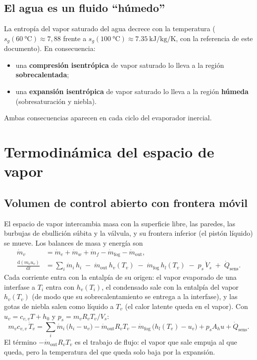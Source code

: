 \documentclass[11pt,a4paper]{article}
\newcommand{\dd}{\mathrm{d}}
\newcommand{\mdot}{\dot m}
\newcommand{\Qdot}{\dot Q}
\begin{document}
\subsection{El agua es un fluido ``húmedo''}

La entropía del vapor saturado del agua decrece con la temperatura ($s_g(\SI{60}{\celsius})\approx 7{,}88$ frente a $s_g(\SI{100}{\celsius})\approx\SI{7.35}{\kilo\joule\per\kilo\gram\per\kelvin}$, con la referencia de este documento). En consecuencia:
\begin{itemize}
\item una \textbf{compresión isentrópica} de vapor saturado lo lleva a la región \textbf{sobrecalentada};
\item una \textbf{expansión isentrópica} de vapor saturado lo lleva a la región \textbf{húmeda} (sobresaturación y niebla).
\end{itemize}
Ambas consecuencias aparecen en cada ciclo del evaporador inercial.

\section{Termodinámica del espacio de vapor}\label{sec:vapor}

\subsection{Volumen de control abierto con frontera móvil}

El espacio de vapor intercambia masa con la superficie libre, las paredes, las burbujas de ebullición súbita y la válvula, y su frontera inferior (el pistón líquido) se mueve. Los balances de masa y energía son
\begin{align}
\dot m_v &= \mdot_e + \mdot_w + \mdot_f - \mdot_{\mathrm{fog}} - \mdot_{\mathrm{out}},\\
\frac{\dd (m_v u_v)}{\dd t} &= \sum_i \mdot_i\,h_i \;-\; \mdot_{\mathrm{out}}\,h_v(T_v) \;-\; \mdot_{\mathrm{fog}}\,h_l(T_v) \;-\; p_s\,\dot V_s \;+\; \Qdot_{\mathrm{sens}} .
\end{align}
Cada corriente entra con la entalpía de su origen: el vapor evaporado de una interfase a $T_i$ entra con $h_v(T_i)$, el condensado sale con la entalpía del vapor $h_v(T_v)$ (de modo que su sobrecalentamiento se entrega a la interfase), y las gotas de niebla salen como líquido a $T_v$ (el calor latente queda en el vapor). Con $u_v = c_{v,v}T + h_0$ y $p_s = m_v R_v T_v/V_s$:
\begin{equation}
m_v c_{v,v}\,\dot T_v = \sum_i \mdot_i\,\bigl(h_i - u_v\bigr) - \mdot_{\mathrm{out}} R_v T_v - \mdot_{\mathrm{fog}}\,\bigl(h_l(T_v)-u_v\bigr) + p_s A_h u + \Qdot_{\mathrm{sens}} .
\end{equation}
El término $-\mdot_{\mathrm{out}}R_vT_v$ es el trabajo de flujo: el vapor que sale empuja al que queda, pero la temperatura del que queda solo baja por la expansión.
\end{document}
